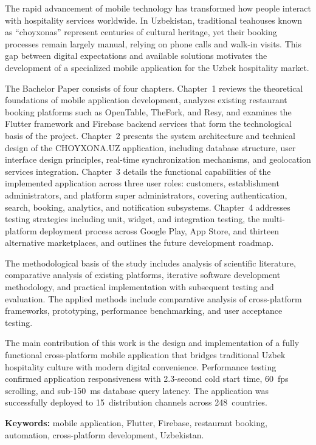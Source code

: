 \frontmatterpage
{}

The rapid advancement of mobile technology has transformed how people interact with hospitality services worldwide. In Uzbekistan, traditional teahouses known as ``choyxonas'' represent centuries of cultural heritage, yet their booking processes remain largely manual, relying on phone calls and walk-in visits. This gap between digital expectations and available solutions motivates the development of a specialized mobile application for the Uzbek hospitality market.

The Bachelor Paper consists of four chapters. Chapter~1 reviews the theoretical foundations of mobile application development, analyzes existing restaurant booking platforms such as OpenTable, TheFork, and Resy, and examines the Flutter framework and Firebase backend services that form the technological basis of the project. Chapter~2 presents the system architecture and technical design of the CHOYXONA.UZ application, including database structure, user interface design principles, real-time synchronization mechanisms, and geolocation services integration. Chapter~3 details the functional capabilities of the implemented application across three user roles: customers, establishment administrators, and platform super administrators, covering authentication, search, booking, analytics, and notification subsystems. Chapter~4 addresses testing strategies including unit, widget, and integration testing, the multi-platform deployment process across Google Play, App Store, and thirteen alternative marketplaces, and outlines the future development roadmap.

The methodological basis of the study includes analysis of scientific literature, comparative analysis of existing platforms, iterative software development methodology, and practical implementation with subsequent testing and evaluation. The applied methods include comparative analysis of cross-platform frameworks, prototyping, performance benchmarking, and user acceptance testing.

The main contribution of this work is the design and implementation of a fully functional cross-platform mobile application that bridges traditional Uzbek hospitality culture with modern digital convenience. Performance testing confirmed application responsiveness with 2.3-second cold start time, 60~fps scrolling, and sub-150~ms database query latency. The application was successfully deployed to 15~distribution channels across 248~countries.

\thesisscopeEN

\textbf{Keywords:} mobile application, Flutter, Firebase, restaurant booking, automation, cross-platform development, Uzbekistan.
